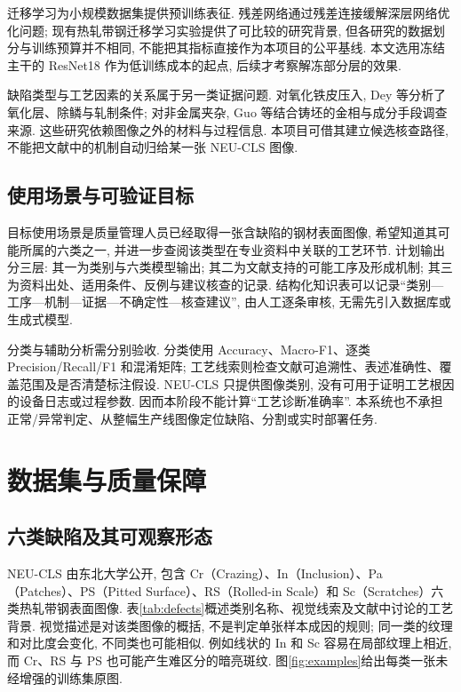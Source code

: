 \documentclass[letterpaper, 10 pt, conference]{ieeeconf}
\begin{document}
迁移学习为小规模数据集提供预训练表征. 残差网络通过残差连接缓解深层网络优化问题\cite{resnet}; 现有热轧带钢迁移学习实验提供了可比较的研究背景, 但各研究的数据划分与训练预算并不相同, 不能把其指标直接作为本项目的公平基线\cite{wu-transfer}. 本文选用冻结主干的 ResNet18 作为低训练成本的起点, 后续才考察解冻部分层的效果.

缺陷类型与工艺因素的关系属于另一类证据问题. 对氧化铁皮压入, Dey 等分析了氧化层、除鳞与轧制条件; 对非金属夹杂, Guo 等结合铸坯的金相与成分手段调查来源\cite{dey-scale,guo-inclusion}. 这些研究依赖图像之外的材料与过程信息. 本项目可借其建立候选核查路径, 不能把文献中的机制自动归给某一张 NEU-CLS 图像.

\subsection{使用场景与可验证目标}
目标使用场景是质量管理人员已经取得一张含缺陷的钢材表面图像, 希望知道其可能所属的六类之一, 并进一步查阅该类型在专业资料中关联的工艺环节. 计划输出分三层: 其一为类别与六类模型输出; 其二为文献支持的可能工序及形成机制; 其三为资料出处、适用条件、反例与建议核查的记录. 结构化知识表可以记录“类别—工序—机制—证据—不确定性—核查建议”, 由人工逐条审核, 无需先引入数据库或生成式模型.

分类与辅助分析需分别验收. 分类使用 Accuracy、Macro-F1、逐类 Precision/Recall/F1 和混淆矩阵; 工艺线索则检查文献可追溯性、表述准确性、覆盖范围及是否清楚标注假设. NEU-CLS 只提供图像类别, 没有可用于证明工艺根因的设备日志或过程参数\cite{neu-database}. 因而本阶段不能计算“工艺诊断准确率”. 本系统也不承担正常/异常判定、从整幅生产线图像定位缺陷、分割或实时部署任务.


\section{数据集与质量保障}
\subsection{六类缺陷及其可观察形态}
NEU-CLS 由东北大学公开, 包含 Cr（Crazing）、In（Inclusion）、Pa（Patches）、PS（Pitted Surface）、RS（Rolled-in Scale）和 Sc（Scratches）六类热轧带钢表面图像\cite{neu-database}. 表\ref{tab:defects}概述类别名称、视觉线索及文献中讨论的工艺背景. 视觉描述是对该类图像的概括, 不是判定单张样本成因的规则; 同一类的纹理和对比度会变化, 不同类也可能相似\cite{neu-database,wen-survey}. 例如线状的 In 和 Sc 容易在局部纹理上相近, 而 Cr、RS 与 PS 也可能产生难区分的暗亮斑纹. 图\ref{fig:examples}给出每类一张未经增强的训练集原图.
\end{document}
